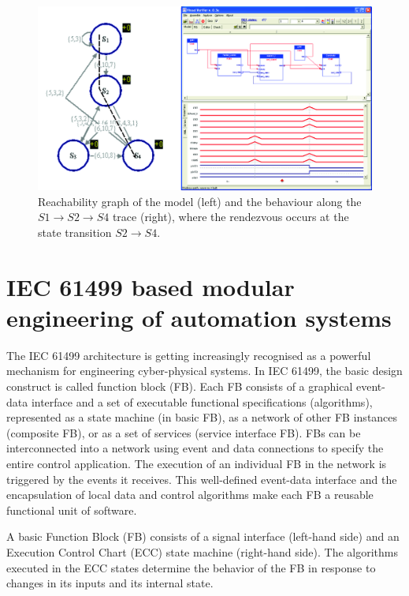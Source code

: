 \documentclass[runningheads]{llncs}
\newcommand{\ra}{{\rightarrow}}
\begin{document}
\begin {figure}
    \centering
    \includegraphics [width = .9 \textwidth] {images/verification.jpg}
    \caption {Reachability graph of the model (left) and the behaviour along the $S1\ra S2\ra S4$ trace (right), where the rendezvous occurs at the state transition  $S2\ra S4$.}
    \label {fig:verification}
\end {figure}

\section{IEC 61499 based modular engineering of automation systems}\label{sec:61499}

The {IEC 61499} architecture \cite{iec61499} is getting increasingly recognised as a powerful mechanism for engineering cyber-physical systems. 
In IEC 61499, the basic design construct is called function block (FB). Each FB consists of a graphical event-data interface and a set of executable functional specifications (algorithms), represented as a state machine (in basic FB), as a network of other FB instances (composite FB), or as a set of services (service interface FB). FBs can be interconnected into a network using event and data connections to specify the entire control application. The execution of an individual FB in the network is triggered by the events it receives. This well-defined event-data interface and the encapsulation of local data and control algorithms make each FB a reusable functional unit of software.



A basic Function Block (FB)  consists of a signal interface (left-hand side) and an Execution Control Chart (ECC) state machine (right-hand side). The algorithms executed in the ECC states determine the behavior of the FB in response to changes in its inputs and its internal state.
\end{document}

